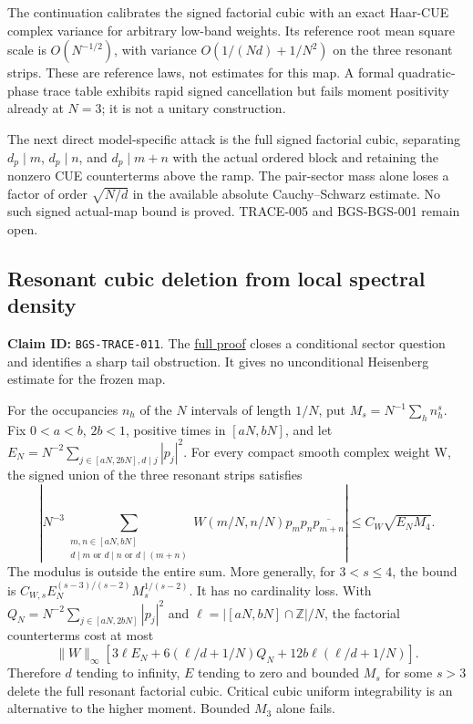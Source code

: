 The continuation calibrates the signed factorial cubic with an exact
Haar-CUE complex variance for arbitrary low-band weights. Its reference
root mean square scale is \(O(N^{-1/2})\), with variance
\(O(1/(Nd)+1/N^2)\) on the three resonant strips. These are reference
laws, not estimates for this map. A formal quadratic-phase trace table
exhibits rapid signed cancellation but fails moment positivity already
at \(N=3\); it is not a unitary construction.

The next direct model-specific attack is the full signed factorial cubic,
separating \(d_p\mid m\), \(d_p\mid n\), and \(d_p\mid m+n\) with the actual
ordered block and retaining the nonzero CUE counterterms above the ramp.
The pair-sector mass alone loses a factor of order \(\sqrt{N/d}\) in the
available absolute Cauchy--Schwarz estimate. No such signed actual-map
bound is proved. TRACE-005 and BGS-BGS-001 remain open.

\hypertarget{resonant-cubic-deletion-from-local-spectral-density}{%
\subsection{Resonant cubic deletion from local spectral density}\label{resonant-cubic-deletion-from-local-spectral-density}}

\textbf{Claim ID:} \texttt{BGS-TRACE-011}. The \href{https://github.com/ChurilovMaksim/BGS/blob/main/mathematics/resonant_cubic_density_control.md}{full proof}
closes a conditional sector question and identifies a sharp tail obstruction.
It gives no unconditional Heisenberg estimate for the frozen map.

For the occupancies \(n_h\) of the \(N\) intervals of length \(1/N\), put
\(M_s=N^{-1}\sum_h n_h^s\). Fix \(0<a<b\), \(2b<1\), positive times in
\([aN,bN]\), and let \(E_N=N^{-2}\sum_{j\in[aN,2bN],d\mid j}|p_j|^2\).
For every compact smooth complex weight W, the signed union of the three
resonant strips satisfies
\[
\left|N^{-3}\sum_{\substack{m,n\in[aN,bN]\\d\mid m\text{ or }d\mid n\text{ or }d\mid(m+n)}}
 W(m/N,n/N)p_mp_n\overline{p_{m+n}}\right|
 \le C_W\sqrt{E_N M_4}.
\]
The modulus is outside the entire sum. More generally, for \(3<s\le4\),
the bound is \(C_{W,s}E_N^{(s-3)/(s-2)}M_s^{1/(s-2)}\).
It has no cardinality loss. With \(Q_N=N^{-2}\sum_{j\in[aN,2bN]}|p_j|^2\)
and \(\ell=|[aN,bN]\cap\mathbb Z|/N\), the factorial counterterms cost at most
\[
\|W\|_\infty\left[3\ell E_N+6(\ell/d+1/N)Q_N
                   +12b\ell(\ell/d+1/N)\right].
\]
Therefore \(d\) tending to infinity, \(E\) tending to zero and bounded \(M_s\) for
some \(s>3\) delete the full resonant factorial cubic. Critical cubic uniform
integrability is an alternative to the higher moment. Bounded \(M_3\) alone fails.

